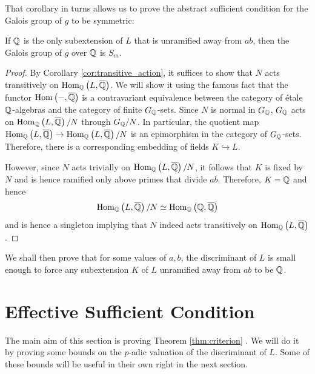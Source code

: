\documentclass[../main.tex]{subfiles}
\begin{document}
That corollary in turns allows us to prove the abstract sufficient condition for the Galois group of $g$ to be symmetric:
\begin{thm}
  \label{thm:strategy}
  If $\mathbb{Q}$ is the only subextension of $L$ that is unramified away from $ab$, then the Galois group of $g$ over $\mathbb{Q}$ is $S_m$.
\end{thm}
\begin{proof}
  By Corollary \ref{cor:transitive_action}, it suffices to show that $N$ acts transitively on $\operatorname{\rm Hom}_{\mathbb{Q}}\left( L, \overline{\mathbb{Q}} \right)$.
  We will show it using the famous fact that the functor $\operatorname{\rm Hom}\left( -, \overline{\mathbb{Q}} \right)$ is a contravariant equivalence between the category of \'{e}tale $\mathbb{Q}$-algebras and the category of finite $G_{\mathbb{Q}}$-sets.
  Since $N$ is normal in $G_{\mathbb{Q}}$, $G_{\mathbb{Q}}$ acts on $\operatorname{\rm Hom}_{\mathbb{Q}}\left( L, \overline{\mathbb{Q}} \right) / N$  through $G_{\mathbb{Q}}/N$.
  In particular, the quotient map $\operatorname{\rm Hom}_{\mathbb{Q}}\left( L, \overline{\mathbb{Q}} \right) \to \operatorname{\rm Hom}_{\mathbb{Q}}\left( L, \overline{\mathbb{Q}} \right) / N$ is an epimorphism in the category of $G_{\mathbb{Q}}$-sets.
  Therefore, there is a corresponding embedding of fields $K \hookrightarrow L$.
  
  However, since $N$ acts trivially on $\operatorname{\rm Hom}_{\mathbb{Q}}\left( L, \overline{\mathbb{Q}} \right) / N$, it follows that $K$ is fixed by $N$ and is hence ramified only above primes that divide $ab$.
  Therefore, $K = \mathbb{Q}$ and hence 
  \[
    \operatorname{\rm Hom}_{\mathbb{Q}}\left( L, \overline{\mathbb{Q}} \right) / N \simeq 
    \operatorname{\rm Hom}_{\mathbb{Q}}\left( \mathbb{Q}, \overline{\mathbb{Q}} \right) 
  \] 
  and is hence a singleton implying that $N$ indeed acts transitively on $\operatorname{\rm Hom}_{\mathbb{Q}}\left( L, \overline{\mathbb{Q}} \right)$.
\end{proof}
We shall then prove that for some values of $a,b$, the discriminant of $L$ is small enough to force any subextension $K$ of $L$ unramified away from $ab$ to be $\mathbb{Q}$.

\section{Effective Sufficient Condition}
The main aim of this section is proving Theorem \ref{thm:criterion} .
We will do it by proving some bounds on the $p$-adic valuation of the discriminant of $L$. Some of these bounds will be useful in their own right in the next section.
\end{document}
